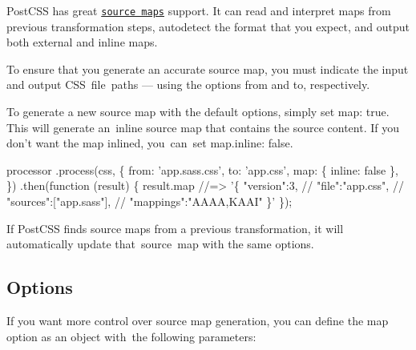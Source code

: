 Post\+C\+SS has great \href{http://www.html5rocks.com/en/tutorials/developertools/sourcemaps/}{\tt source maps} support. It can read and interpret maps from previous transformation steps, autodetect the format that you expect, and output both external and inline maps.

To ensure that you generate an accurate source map, you must indicate the input and output C\+S\+S file paths — using the options {\ttfamily from} and {\ttfamily to}, respectively.

To generate a new source map with the default options, simply set {\ttfamily map\+: true}. This will generate an inline source map that contains the source content. If you don’t want the map inlined, you can set {\ttfamily map.\+inline\+: false}.


\begin{DoxyCode}
processor
    .process(css, \{
        from: 'app.sass.css',
        to:   'app.css',
        map: \{ inline: false \},
    \})
    .then(function (result) \{
        result.map //=> '\{ "version":3,
                   //      "file":"app.css",
                   //      "sources":["app.sass"],
                   //       "mappings":"AAAA,KAAI" \}'
    \});
\end{DoxyCode}


If Post\+C\+SS finds source maps from a previous transformation, it will automatically update that source map with the same options.

\subsection*{Options}

If you want more control over source map generation, you can define the {\ttfamily map} option as an object with the following parameters\+:


